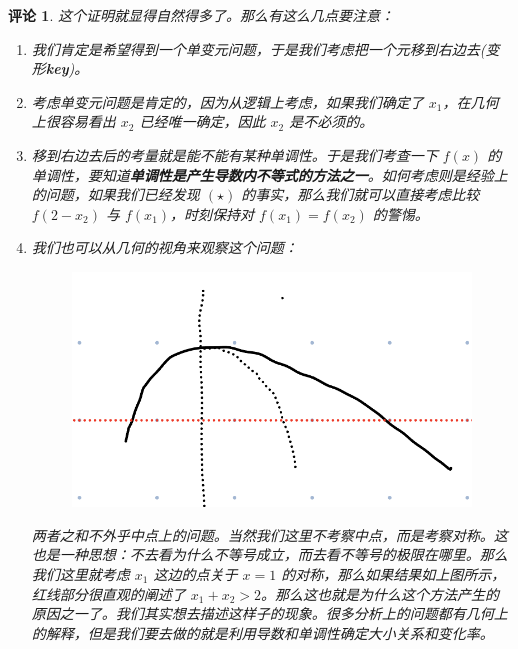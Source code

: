 \documentclass[a4paper,10pt]{article}
\newtheorem{remark}{评论}
\begin{document}
\begin{remark}
    这个证明就显得自然得多了。那么有这么几点要注意：
    \begin{enumerate}[$ (1) $]
        \item 我们肯定是希望得到一个单变元问题，于是我们考虑把一个元移到右边去(变形\textbf{key})。
        \item 考虑单变元问题是肯定的，因为从逻辑上考虑，如果我们确定了 $ x_1 $，在几何上很容易看出 $ x_2  $ 已经唯一确定，因此 $ x_2  $ 是不必须的。
        \item 移到右边去后的考量就是能不能有某种单调性。于是我们考查一下 $ f(x)  $ 的单调性，要知道\textbf{单调性是产生导数内不等式的方法之一}。如何考虑则是经验上的问题，如果我们已经发现 $ (\star) $ 的事实，那么我们就可以直接考虑比较 $ f(2-x_2) $ 与 $ f(x_1) $，时刻保持对 $ f(x_1)=f(x_2) $ 的警惕。
        \item 我们也可以从几何的视角来观察这个问题：
        \begin{figure}[htp]
            \centering
            \includegraphics[scale=0.5]{picture1.png}
        \end{figure}

        两者之和不外乎中点上的问题。当然我们这里不考察中点，而是考察对称。这也是一种思想：不去看为什么不等号成立，而去看不等号的极限在哪里。那么我们这里就考虑 $ x_1  $ 这边的点关于 $ x=1  $ 的对称，那么如果结果如上图所示，红线部分很直观的阐述了 $ x_1+x_2>2 $。那么这也就是为什么这个方法产生的原因之一了。我们其实想去描述这样子的现象。很多分析上的问题都有几何上的解释，但是我们要去做的就是利用导数和单调性确定大小关系和变化率。 
    \end{enumerate}
\end{remark}
\end{document}
